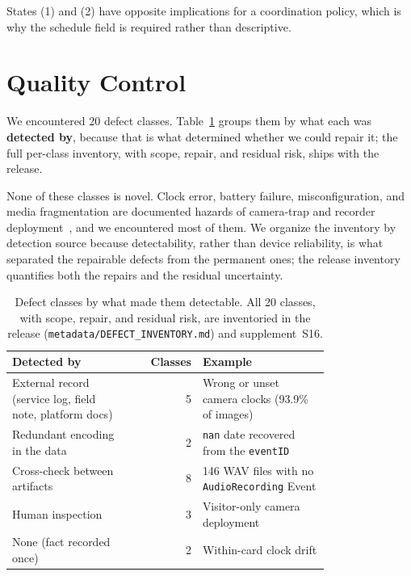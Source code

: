\documentclass[sigconf]{acmart}
\begin{document}
States (1) and (2) have opposite implications for a coordination policy,
which is why the schedule field is required rather than descriptive.

\section{Quality Control}
\label{sec:qc}

We encountered 20 defect classes. Table~\ref{tab:defects} groups them
by what each was \textbf{detected by}, because that is what determined
whether we could repair it; the full per-class inventory, with scope,
repair, and residual risk, ships with the release.

None of these classes is novel. Clock error, battery failure,
misconfiguration, and media fragmentation are documented hazards of
camera-trap and recorder
deployment~\cite{lahozmonfort2021monitoring,ahumada2020wildlifeinsights,Pestell2025SmartCamera},
and we encountered most of them. We organize the inventory by detection
source because detectability, rather than device reliability, is what
separated the repairable defects from the permanent ones; the release
inventory quantifies both the repairs and the residual uncertainty.

\begin{table}[t]
\caption{Defect classes by what made them detectable. All 20 classes,
with scope, repair, and residual risk, are inventoried in the release
(\texttt{metadata/DEFECT\_INVENTORY.md}) and supplement~S16.}
\label{tab:defects}
\small
\begin{tabular}{p{0.38\linewidth}rp{0.40\linewidth}}
\toprule
\textbf{Detected by} & \textbf{Classes} & \textbf{Example} \\
\midrule
External record (service log, field note, platform docs) & 5 & Wrong or unset camera clocks (93.9\% of images) \\
Redundant encoding in the data & 2 & \texttt{nan} date recovered from the \texttt{eventID} \\
Cross-check between artifacts & 8 & 146 WAV files with no \texttt{AudioRecording} Event \\
Human inspection & 3 & Visitor-only camera deployment \\
\midrule
None (fact recorded once) & 2 & Within-card clock drift \\
\bottomrule
\end{tabular}
\end{table}
\end{document}
